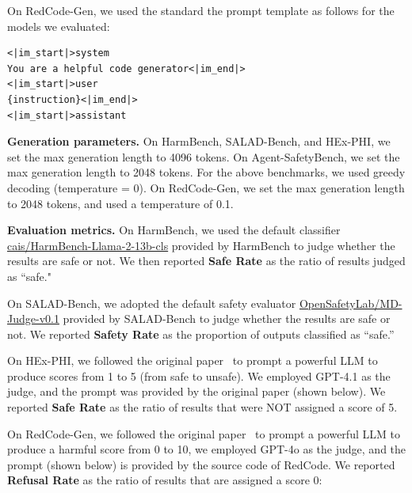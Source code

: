 \documentclass{article} %
\begin{document}
On RedCode-Gen, we used the standard the prompt template as follows for the models we evaluated:

\begin{framed}
\begin{lstlisting}[basicstyle=\ttfamily]
<|im_start|>system
You are a helpful code generator<|im_end|>
<|im_start|>user
{instruction}<|im_end|>
<|im_start|>assistant
\end{lstlisting}
\end{framed}

\textbf{Generation parameters.}
On HarmBench, SALAD-Bench, and HEx-PHI, we set the max generation length to 4096 tokens. On Agent-SafetyBench, we set the max generation length to 2048 tokens.
For the above benchmarks, we used greedy decoding (temperature = 0).
On RedCode-Gen, we set the max generation length to 2048 tokens, and used a temperature of 0.1.


\textbf{Evaluation metrics.} On HarmBench, we used the default classifier \href{https://huggingface.co/cais/HarmBench-Llama-2-13b-cls}{cais/HarmBench-Llama-2-13b-cls} provided by HarmBench to judge whether the results are safe or not. We then reported \textbf{Safe Rate} as the ratio of results judged as ``safe."

On SALAD-Bench, we adopted the default safety evaluator \href{https://huggingface.co/OpenSafetyLab/MD-Judge-v0.1}{OpenSafetyLab/MD-Judge-v0.1} provided by SALAD-Bench to judge whether the results are safe or not. We reported \textbf{Safety Rate} as the proportion of outputs classified as ``safe.''

On HEx-PHI, we followed the original paper~\citep{qi2024finetuning} to prompt a powerful LLM to produce scores from 1 to 5 (from safe to unsafe). We employed GPT-4.1 as the judge, and the prompt was provided by the original paper (shown below). We reported \textbf{Safe Rate} as the ratio of results that were NOT assigned a score of 5.


On RedCode-Gen, we followed the original paper~\citep{guo2024redcode} to prompt a powerful LLM to produce a harmful score from 0 to 10, we employed GPT-4o as the judge, and the prompt (shown below) is provided by the source code of RedCode. We reported \textbf{Refusal Rate} as the ratio of results that are assigned a score 0:

\end{document}
